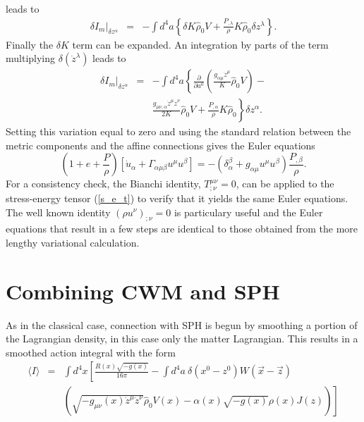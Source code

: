 leads to 
\begin{eqnarray}
\delta I_{m} \vert_{\delta z^{\alpha}} 
	& = & 
	- \int d^4a \! 
	\left\{ 
		\delta K {\hat \rho}_{0} V 
		+ \frac{P_{,\lambda}}{\rho} K {\hat \rho}_{0} \delta z^{\lambda} 
	\right\}.
\end{eqnarray}
Finally the $\delta K$ term can be expanded.  An integration by parts of the term multiplying $\delta(\dot z^{\lambda})$ leads to
\begin{eqnarray}
\delta I_{m} \vert_{\delta z^{\alpha}} 
	& = & 
	- \int d^4a \! 
	\left\{ 
		\frac{\partial}{\partial a^{0}} \left( \frac{g_{\alpha \mu} 
		{\dot z}^{\mu}}{K} {\hat \rho}_{0} V \right) - 
	\right. \nonumber \\
	& & 
	\left.
		\frac{g_{\mu \nu,\alpha} {\dot z}^{\mu} {\dot z^{\nu}} }{2K}
		{\hat \rho}_{0} V 
		+ \frac{P_{,\alpha}}{\rho} K {\hat \rho}_{0}
	\right\} 
	\delta z^{\alpha}.
\end{eqnarray}
Setting this variation equal to zero and using the standard relation between the metric components and the affine connections gives the Euler equations
\begin{equation}
\left(1 + e + \frac{P}{\rho} \right) \left[ {\dot u}_{\alpha} + \Gamma_{\alpha \mu \beta} u^{\mu} u^{\beta} \right] = - \left( \delta_{\alpha}^{\beta} + g_{\alpha \mu} u^{\mu} u^{\beta} \right) \frac{P_{,\beta}}{\rho}.
\end{equation}
For a consistency check, the Bianchi identity, $T^{\mu \nu}_{;\nu} = 0$, can be applied to the stress-energy tensor (\ref{s_e_t}) to verify that it yields the same Euler equations.  The well known identity $(\rho u^{\nu})_{;\nu} = 0$ is particulary useful and the Euler equations that result in a few steps are identical to those obtained from the more lengthy variational calculation.  


\section{Combining CWM and SPH}\label{cfmsph}
As in the classical case, connection with SPH is begun by smoothing a portion of the Lagrangian density, in this case only the matter Lagrangian.  This results in a smoothed action integral with the form
\begin{eqnarray}
\langle I \rangle &  = &  \int \! {d^4}x  \left[  \frac{R(x){\sqrt{-g(x)}}}{16\pi} - \int \! {d^4}a \ \delta(x^0 - z^0) W({\vec x} - {\vec z}) \right. \nonumber \\
& &
  \left. \left( \sqrt{-g_{\mu\nu}(x){\dot z}^{\mu}{\dot z}^{\nu}} {\hat \rho}_{0} V(x) -\alpha(x)\sqrt{-g(x)} \rho(x) J(z) \right) \right] 
\end{eqnarray}

